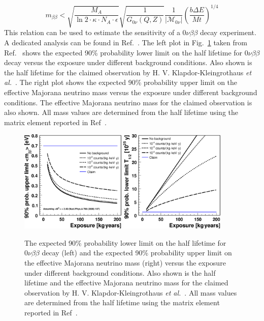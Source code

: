 \begin{equation}
  \label{eq:gerda:mbb}
  m_{\beta\beta} < \sqrt{\frac{M_{A}}{\ln2 \cdot \kappa \cdot N_{A} \cdot \epsilon}} \sqrt{\frac{1}{G_{0\nu}(Q,Z)}} \frac{1}{|\mathcal{M}_{0\nu}|} (\frac{b \Delta E}{M t})^{1/4}
\end{equation}
This relation can be used to estimate the sensitivity of a $0\nu\beta\beta$ decay experiment. A dedicated analysis can be found in Ref.~\cite{Cal06}. The left plot in Fig.~\ref{fig:gerda:limit} taken from Ref.~\cite{Cal06} shows the expected 90\% probability lower limit on the half lifetime for $0\nu\beta\beta$ decay versus the exposure under different background conditions. Also shown is the half lifetime for the claimed observation by H. V. Klapdor-Kleingrothaus \textit{et al.}~\cite{Hei04}. The right plot shows the expected 90\% probability upper limit on the effective Majorana neutrino mass versus the exposure under different background conditions. The effective Majorana neutrino mass for the claimed observation is also shown. All mass values are determined from the half lifetime using the matrix element reported in Ref~\cite{Rod07}.
\begin{figure}[tbhp]
  \centering
  \includegraphics[width=0.45\textwidth]{limit_mass}  \hfil
  \includegraphics[width=0.45\textwidth]{limit_halflife}
  \caption{The expected 90\% probability lower limit on the half     lifetime for $0\nu\beta\beta$ decay (left) and the expected 90\%     probability upper limit on the effective Majorana neutrino mass     (right) versus the exposure under different background conditions.     Also shown is the half lifetime and the effective Majorana     neutrino mass for the claimed observation by H. V.     Klapdor-Kleingrothaus \textit{et al.}~\cite{Hei04}. All mass     values are determined from the half lifetime using the matrix     element reported in Ref~\cite{Rod07}.}
  \label{fig:gerda:limit}
\end{figure}

